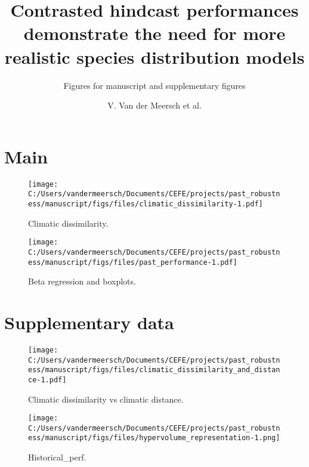 \documentclass[
]{article}
\title{Contrasted hindcast performances demonstrate the need for more
realistic species distribution models}
\subtitle{Figures for manuscript and supplementary figures}
\author{V. Van der Meersch et al.}
\date{}
\begin{document}
\maketitle

\hypertarget{main}{%
\section{Main}\label{main}}

\begin{figure}
\centering
\texttt{[image: C:/Users/vandermeersch/Documents/CEFE/projects/past\_robustness/manuscript/figs/files/climatic\_dissimilarity-1.pdf]}
\caption{Climatic dissimilarity.}
\end{figure}

\newpage

\newpage

\begin{figure}
\centering
\texttt{[image: C:/Users/vandermeersch/Documents/CEFE/projects/past\_robustness/manuscript/figs/files/past\_performance-1.pdf]}
\caption{Beta regression and boxplots.}
\end{figure}

\newpage

\hypertarget{supplementary-data}{%
\section{Supplementary data}\label{supplementary-data}}

\renewcommand{\thefigure}{A.\arabic{figure}}
\setcounter{figure}{0}

\begin{figure}
\centering
\texttt{[image: C:/Users/vandermeersch/Documents/CEFE/projects/past\_robustness/manuscript/figs/files/climatic\_dissimilarity\_and\_distance-1.pdf]}
\caption{Climatic dissimilarity vs climatic distance.}
\end{figure}

\begin{figure}
\centering
\texttt{[image: C:/Users/vandermeersch/Documents/CEFE/projects/past\_robustness/manuscript/figs/files/hypervolume\_representation-1.png]}
\caption{Historical\_perf.}
\end{figure}
\end{document}
